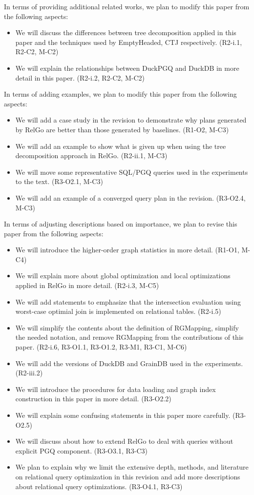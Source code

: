In terms of providing additional related works, we plan to modify this paper from the following aspects:
\begin{itemize}
    \item We will discuss the differences between tree decomposition applied in this paper and the techniques used by EmptyHeaded, CTJ respectively. (R2-i.1, R2-C2, M-C2)
    \item We will explain the relationships between DuckPGQ and DuckDB in more detail in this paper. (R2-i.2, R2-C2, M-C2)
\end{itemize}

In terms of adding examples, we plan to modify this paper from the following aspects:
\begin{itemize}
    \item We will add a case study in the revision to demonstrate why plans generated by RelGo are better than those generated by baselines. (R1-O2, M-C3)
    \item We will add an example to show what is given up when using the tree decomposition approach in RelGo. (R2-ii.1, M-C3)
    \item We will move some representative SQL/PGQ queries used in the experiments to the text. (R3-O2.1, M-C3)
    \item We will add an example of a converged query plan in the revision. (R3-O2.4, M-C3)
\end{itemize}

In terms of adjusting descriptions based on importance, we plan to revise this paper from the following aspects:
\begin{itemize}
    \item We will introduce the higher-order graph statistics in more detail. (R1-O1, M-C4)
    \item We will explain more about global optimization and local optimizations applied in RelGo in more detail. (R2-i.3, M-C5)
    \item We will add statements to emphasize that the intersection evaluation using worst-case optimial join is implemented on relational tables. (R2-i.5)
    \item We will simplify the contents about the definition of RGMapping, simplify the needed notation, and remove RGMapping from the contributions of this paper. (R2-i.6, R3-O1.1, R3-O1.2, R3-M1, R3-C1, M-C6)
    \item We will add the versions of DuckDB and GrainDB used in the experiments. (R2-iii.2)
    \item We will introduce the procedures for data loading and graph index construction in this paper in more detail. (R3-O2.2)
    \item We will explain some confusing statements in this paper more carefully. (R3-O2.5)
    \item We will discuss about how to extend RelGo to deal with queries without explicit PGQ component. (R3-O3.1, R3-C3) 
    \item We plan to explain why we limit the extensive depth, methods, and literature on relational query optimization in this revision and add more descriptions about relational query optimizations. (R3-O4.1, R3-C3)
\end{itemize}

